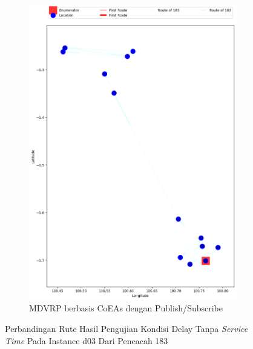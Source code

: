 \begin{figure}[H]\ContinuedFloat
	\centering
	\begin{subfigure}[t]{\textwidth}
		\centering
		\includegraphics[width=\textwidth]{Resources/Images/delayed_3/real_m15_n100_delayed_3_183_pubsub_coes}
		\caption{MDVRP berbasis CoEAs dengan Publish/Subscribe}
		\label{fig:real_m15_n100_delayed_3_183_pubsub_coes}
	\end{subfigure}
	\caption{Perbandingan Rute Hasil Pengujian Kondisi Delay Tanpa \textit{Service Time} Pada Instance d03 Dari Pencacah 183}
	\label{fig:real_m15_n100_delayed_3_183_contd}
\end{figure}


